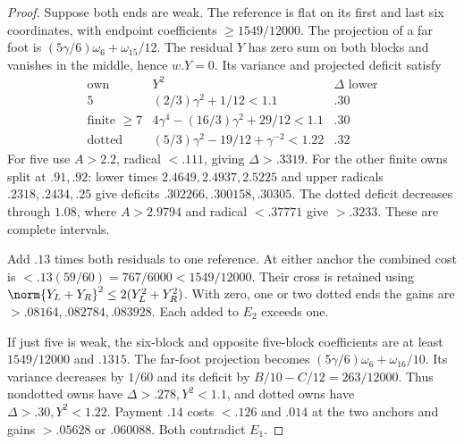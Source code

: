 \begin{proof}
Suppose both ends are weak. The reference is flat on its first
and last six coordinates, with endpoint coefficients
$\ge1549/12000$. The projection of a far foot is
$(5\gamma/6)\omega_6+\omega_{15}/12$.
The residual $Y$ has zero sum on both blocks and vanishes in the
middle, hence $w.Y=0$. Its variance and projected deficit satisfy
\[
\begin{array}{c|c|c}
\text{own}&Y^2&\Delta\text{ lower}\\\hline
5&(2/3)\gamma^2+1/12<1.1&.30\\
\text{finite }\ge7&4\gamma^4-(16/3)\gamma^2+29/12<1.1&.30\\
\text{dotted}&(5/3)\gamma^2-19/12+\gamma^{-2}<1.22&.32
\end{array}
\]
For five use $A>2.2$, radical $<.111$, giving $\Delta>.3319$.
For the other finite owns split at $.91,.92$: lower times
$2.4649,2.4937,2.5225$ and upper radicals $.2318,.2434,.25$
give deficits $.302266,.300158,.30305$.
The dotted deficit decreases through $1.08$, where $A>2.9794$
and radical $<.37771$ give $>.3233$. These are complete intervals.

Add $.13$ times both residuals to one reference. At either anchor
the combined cost is $<.13(59/60)=767/6000<1549/12000$.
Their cross is retained using
$\norm{Y_L+Y_R}^2\le2(Y_L^2+Y_R^2)$.
With zero, one or two dotted ends the gains are
$>.08164,.082784,.083928$. Each added to $E_2$ exceeds one.

If just five is weak, the six-block and opposite five-block
coefficients are at least $1549/12000$ and $.1315$.
The far-foot projection becomes
$(5\gamma/6)\omega_6+\omega_{16}/10$.
Its variance decreases by $1/60$ and its deficit by
$B/10-C/12=263/12000$. Thus nondotted owns have
$\Delta>.278,Y^2<1.1$, and dotted owns have
$\Delta>.30,Y^2<1.22$. Payment $.14$ costs $<.126$ and
$.014$ at the two anchors and gains $>.05628$ or $.060088$.
Both contradict $E_1$.


\end{proof}
